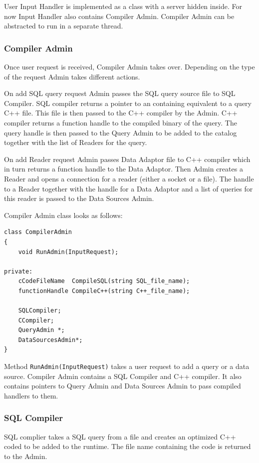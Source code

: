 \documentclass[14pt]{article}
\begin{document}
User Input Handler is implemented as a class with a server hidden inside. For now Input Handler also contains Compiler Admin. Compiler Admin can be abstracted to run in a separate thread. 

\subsubsection{Compiler Admin}

Once user request is received, Compiler Admin takes over. Depending on the type of the request Admin takes different actions. 

On add SQL query request Admin passes the SQL query source file to SQL Compiler. SQL compiler returns a pointer to an containing equivalent to a query C++ file. This file is then passed to the C++ compiler by the Admin. C++ compiler returns a function handle to the compiled binary of the query. The query handle is then passed to the Query Admin to be added to the catalog together with the list of Readers for the query.

On add Reader request Admin passes Data Adaptor file to C++ compiler which in turn returns a function handle to the Data Adaptor. Then Admin creates a Reader and opens a connection for a reader (either a socket or a file). The handle to a Reader together with the handle for a Data Adaptor and a list of queries for this reader is passed to the Data Sources Admin. 

\noindent Compiler Admin class looks as follows:
\begin{verbatim}
class CompilerAdmin
{
    void RunAdmin(InputRequest);

private:
    cCodeFileName  CompileSQL(string SQL_file_name);
    functionHandle CompileC++(string C++_file_name);
	
    SQLCompiler;
    CCompiler;
    QueryAdmin *;
    DataSourcesAdmin*;
}
\end{verbatim}

Method {\tt RunAdmin(InputRequest)} takes a user request to add a query or a data source. Compiler Admin contains a SQL Compiler and C++ compiler. It also contains pointers to Query Admin and Data Sources Admin to pass compiled handlers to them.

\subsubsection{SQL Compiler}

SQL complier takes a SQL query from a file and creates an optimized C++ coded to be added to the runtime. The file name containing the code is returned to the Admin.
\end{document}
